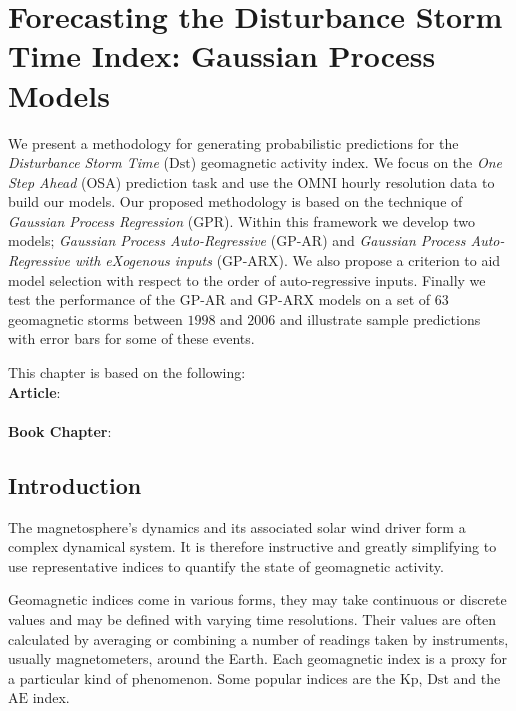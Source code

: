 \chapter{Forecasting the Disturbance Storm Time Index: Gaussian Process Models}\label{chapter:dst_osa}

{\small
    We present a methodology for generating probabilistic predictions for the 
    \emph{Disturbance Storm Time} ($\mathrm{Dst}$) geomagnetic activity index. We focus on the 
    \emph{One Step Ahead} (OSA) prediction task and use the OMNI hourly resolution data to build 
    our models. Our proposed methodology is based on the technique of 
    \emph{Gaussian Process Regression} (GPR). Within this framework we develop two models; 
    \emph{Gaussian Process Auto-Regressive} (GP-AR) and 
    \emph{Gaussian Process Auto-Regressive with eXogenous inputs} (GP-ARX). We also propose a 
    criterion to aid model selection with respect to the order of auto-regressive inputs. 
    Finally we test the performance of the GP-AR and GP-ARX models on a set of $63$ geomagnetic 
    storms between $1998$ and $2006$ and illustrate sample predictions with error bars for some of 
    these events.
}
        
\vfill
{}
\vfill

\noindent
    \parbox{\textwidth}{%
        {\small This chapter is based on the following:\\
        
        \textbf{Article}:\\
        \\
        
        \textbf{Book Chapter}:\\
        }
    }%

\clearpage

\section{Introduction}


The magnetosphere's dynamics and its associated solar wind driver form a complex dynamical system. 
It is therefore instructive and greatly simplifying to use representative indices to quantify the 
state of geomagnetic activity.

Geomagnetic indices come in various forms, they may take continuous or discrete values and may be 
defined with varying time resolutions. Their values are often calculated by averaging or combining 
a number of readings taken by instruments, usually magnetometers, around the Earth. Each 
geomagnetic index is a proxy for a particular kind of phenomenon. Some popular indices are the 
$\mathrm{Kp}$, $\mathrm{Dst}$ and the $\mathrm{AE}$ index.


